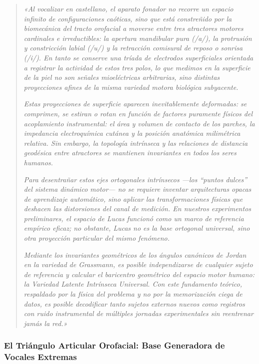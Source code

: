 \documentclass[11pt,a4paper]{article}
\begin{document}
\begin{quote}
\small
\textit{«Al vocalizar en castellano, el aparato fonador no recorre un espacio infinito de configuraciones caóticas, sino que está constreñido por la biomecánica del tracto orofacial a moverse entre tres atractores motores cardinales e irreductibles: la apertura mandibular pura (/a/), la protrusión y constricción labial (/u/) y la retracción comisural de reposo o sonrisa (/i/). En tanto se conserve una tríada de electrodos superficiales orientada a registrar la actividad de estos tres polos, lo que medimos en la superficie de la piel no son señales mioeléctricas arbitrarias, sino distintas proyecciones afines de la misma variedad motora biológica subyacente.}

\textit{Estas proyecciones de superficie aparecen inevitablemente deformadas: se comprimen, se estiran o rotan en función de factores puramente físicos del acoplamiento instrumental: el área y volumen de contacto de los parches, la impedancia electroquímica cutánea y la posición anatómica milimétrica relativa. Sin embargo, la topología intrínseca y las relaciones de distancia geodésica entre atractores se mantienen invariantes en todos los seres humanos.}

\textit{Para desentrañar estos ejes ortogonales intrínsecos ---los ``puntos dulces'' del sistema dinámico motor--- no se requiere inventar arquitecturas opacas de aprendizaje automático, sino aplicar las transformaciones físicas que deshacen las distorsiones del canal de medición. En nuestros experimentos preliminares, el espacio de Lucas funcionó como un marco de referencia empírico eficaz; no obstante, Lucas no es la base ortogonal universal, sino otra proyección particular del mismo fenómeno.}

\textit{Mediante los invariantes geométricos de los ángulos canónicos de Jordan en la variedad de Grassmann, es posible independizarse de cualquier sujeto de referencia y calcular el baricentro geométrico del espacio motor humano: la Variedad Latente Intrínseca Universal. Con este fundamento teórico, respaldado por la física del problema y no por la memorización ciega de datos, es posible decodificar tanto sujetos externos nuevos como registros con ruido instrumental de múltiples jornadas experimentales sin reentrenar jamás la red.»}
\end{quote}

\subsubsection{El Triángulo Articular Orofacial: Base Generadora de Vocales Extremas}
\label{subsubsec:triangulo_articular_orofacial}
\end{document}
